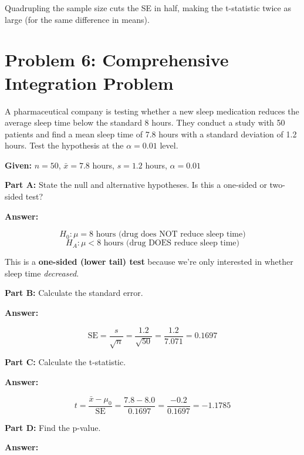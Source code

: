 \documentclass[11pt]{article}
\begin{document}
Quadrupling the sample size cuts the SE in half, making the t-statistic twice as large (for the same difference in means).

\newpage

\section{Problem 6: Comprehensive Integration Problem}

A pharmaceutical company is testing whether a new sleep medication reduces the average sleep time below the standard 8 hours. They conduct a study with 50 patients and find a mean sleep time of 7.8 hours with a standard deviation of 1.2 hours. Test the hypothesis at the $\alpha = 0.01$ level.

\textbf{Given:} $n = 50$, $\bar{x} = 7.8$ hours, $s = 1.2$ hours, $\alpha = 0.01$

\vspace{6pt}

\textbf{Part A:} State the null and alternative hypotheses. Is this a one-sided or two-sided test?

\textcolor{answergreen}{\textbf{Answer:}}

$$H_0: \mu = 8 \text{ hours (drug does NOT reduce sleep time)}$$
$$H_A: \mu < 8 \text{ hours (drug DOES reduce sleep time)}$$

This is a \textbf{one-sided (lower tail) test} because we're only interested in whether sleep time \textit{decreased}.

\vspace{6pt}

\textbf{Part B:} Calculate the standard error.

\textcolor{answergreen}{\textbf{Answer:}}

$$\text{SE} = \frac{s}{\sqrt{n}} = \frac{1.2}{\sqrt{50}} = \frac{1.2}{7.071} = 0.1697$$

\vspace{6pt}

\textbf{Part C:} Calculate the t-statistic.

\textcolor{answergreen}{\textbf{Answer:}}

$$t = \frac{\bar{x} - \mu_0}{\text{SE}} = \frac{7.8 - 8.0}{0.1697} = \frac{-0.2}{0.1697} = -1.1785$$

\vspace{6pt}

\textbf{Part D:} Find the p-value.

\textcolor{answergreen}{\textbf{Answer:}}
\end{document}
